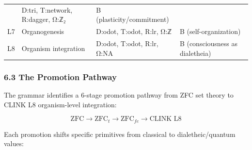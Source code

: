 \documentclass[12pt,a4paper]{article}
\begin{document}
\begin{longtable}[]{@{}llll@{}}
\begin{minipage}[t]{0.23\columnwidth}
\end{minipage} & \begin{minipage}[t]{0.27\columnwidth}\raggedright
D:tri, T:network, R:dagger, Ω:ℤ₂\strut
\end{minipage} & \begin{minipage}[t]{0.25\columnwidth}\raggedright
B (plasticity/commitment)\strut
\end{minipage}\tabularnewline
\begin{minipage}[t]{0.13\columnwidth}\raggedright
L7\strut
\end{minipage} & \begin{minipage}[t]{0.23\columnwidth}\raggedright
Organogenesis\strut
\end{minipage} & \begin{minipage}[t]{0.27\columnwidth}\raggedright
D:odot, T:odot, R:lr, Ω:ℤ\strut
\end{minipage} & \begin{minipage}[t]{0.25\columnwidth}\raggedright
B (self-organization)\strut
\end{minipage}\tabularnewline
\begin{minipage}[t]{0.13\columnwidth}\raggedright
L8\strut
\end{minipage} & \begin{minipage}[t]{0.23\columnwidth}\raggedright
Organism integration\strut
\end{minipage} & \begin{minipage}[t]{0.27\columnwidth}\raggedright
D:odot, T:odot, R:lr, Ω:NA\strut
\end{minipage} & \begin{minipage}[t]{0.25\columnwidth}\raggedright
B (consciousness as dialetheia)\strut
\end{minipage}\tabularnewline
\bottomrule
\end{longtable}

\hypertarget{the-promotion-pathway}{%
\subsubsection{6.3 The Promotion Pathway}\label{the-promotion-pathway}}

The grammar identifies a 6-stage promotion pathway from ZFC set theory
to CLINK L8 organism-level integration:

\[\text{ZFC} \longrightarrow \text{ZFC}_t \longrightarrow \text{ZFC}_{fe} \longrightarrow \text{CLINK L8}\]

Each promotion shifts specific primitives from classical to
dialetheic/quantum values:
\end{document}
